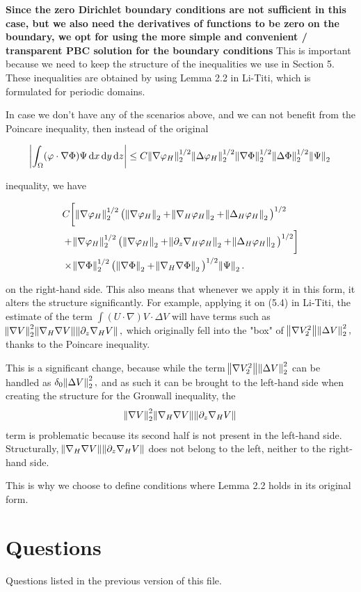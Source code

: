 \documentclass[11pt]{article}
\newcommand*\diff{\mathop{}\!\mathrm{d}}
\begin{document}
\textbf{Since the zero Dirichlet boundary conditions are not sufficient in this case, but we also need the derivatives of functions to be zero on the boundary, we opt for using the more simple and convenient / transparent PBC solution for the boundary conditions }
This is important because we need to keep the structure of the inequalities we use in Section 5. These inequalities are obtained by using Lemma 2.2 in Li-Titi, which is formulated for periodic domains.

In case we don't have any of the scenarios above, and we can not benefit from the Poincare inequality, then instead of the original

$$ \abs{\int_\Omega (\varphi \cdot \nabla \Phi) \Psi \diff x \diff y \diff z} \leq C \norm{\nabla \varphi_H}_2^{1/2} \norm{\Delta \varphi_H}_2^{1/2} \norm{\nabla \Phi}_2^{1/2} \norm{\Delta \Phi}_2^{1/2} \norm{\Psi}_2 $$

inequality, we have

\begin{equation}
  \begin{split}
    & C \bigg [ \norm{\nabla \varphi_H}_2^{1/2} \big ( \norm{\nabla \varphi_H}_2 + \norm{\nabla_H \varphi_H}_2 + \norm{\Delta_H \varphi_H}_2\big )^{1/2} \\
    & + \norm{\nabla \varphi_H}_2^{1/2} \big ( \norm{\nabla \varphi_H}_2 + \norm{\partial_z \nabla_H \varphi_H}_2 + \norm{\Delta_H \varphi_H}_2 \big )^{1/2} \bigg ] \\
    & \times \norm{\nabla \Phi}_2^{1/2}  \big ( \norm{\nabla \Phi}_2 + \norm{\nabla_H \nabla \Phi}_2 \big )^{1/2} \norm{\Psi}_2.
  \end{split}
\end{equation}

on the right-hand side. This also means that whenever we apply it in this form, it alters the structure significantly. For example, applying it on (5.4) in Li-Titi, the estimate of the term $\int (U \cdot \nabla) V \cdot \Delta V$ will have terms such as $\norm{\nabla V}_2^2 \norm{\nabla_H \nabla V} \norm{\partial_z \nabla_H V},$ which originally fell into the "box" of $\norm{\nabla V_2^2} \norm{\Delta V}_2^2,$ thanks to the Poincare inequality.

This is a significant change, because while the term $\norm{\nabla V_2^2} \norm{\Delta V}_2^2$ can be handled as $\delta_0 \norm{\Delta V}_2^2,$ and as such it can be brought to the left-hand side when creating the structure for the Gronwall inequality, the $$\norm{\nabla V}_2^2 \norm{\nabla_H \nabla V} \norm{\partial_z \nabla_H V}$$ term is problematic because its second half is not present in the left-hand side. Structurally, $ \norm{\nabla_H \nabla V} \norm{\partial_z \nabla_H V}$ does not belong to the left, neither to the right-hand side.

This is why we choose to define conditions where Lemma 2.2 holds in its original form.

\section{Questions}

Questions listed in the previous version of this file.
\end{document}
